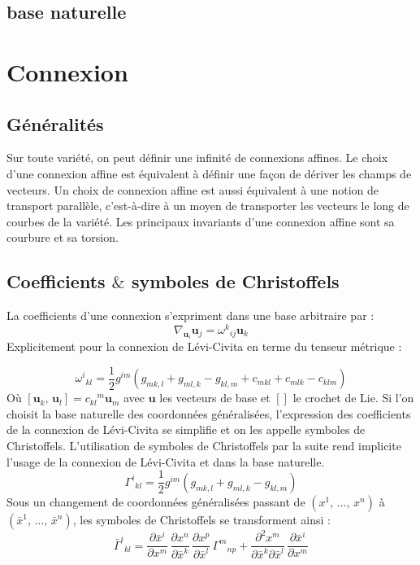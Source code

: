 \documentclass[10pt, a4paper]{report}
\numberwithin{equation}{subsection}
\begin{document}
\subsection{base naturelle}


\section{Connexion}
\subsection{Généralités}
Sur toute variété, on peut définir une infinité de connexions affines. Le choix d'une connexion affine est équivalent à définir une façon de dériver les champs de vecteurs. Un choix de connexion affine est aussi équivalent à une notion de transport parallèle, c'est-à-dire à un moyen de transporter les vecteurs le long de courbes de la variété. Les principaux invariants d'une connexion affine sont sa courbure et sa torsion.


\subsection{Coefficients $\&$ symboles de Christoffels}
La coefficients d'une connexion s'expriment dans une base arbitraire par :
\begin{equation}
\boxed{\nabla_{\mathbf{u}_i}\mathbf{u}_j = {\omega^k}_{ij}\mathbf{u}_k}
\end{equation}
Explicitement pour la connexion de Lévi-Civita en terme du tenseur métrique :

\begin{equation}
\boxed{{\omega^i}_{kl} = \frac{1}{2} g^{im} \left( g_{mk,l} + g_{ml,k} - g_{kl,m} + c_{mkl} + c_{ml k} - c_{kl m} \right)}
\end{equation}
Où $[\mathbf{u}_k,\, \mathbf{u}_l] = {c_{kl}}^m \mathbf{u}_m$ avec $\mathbf{u}$ les vecteurs de base et $[]$ le crochet de Lie.
Si l'on choisit la base naturelle des coordonnées généralisées, l'expression des coefficients de la connexion de Lévi-Civita se simplifie et on les appelle symboles de Christoffels. L'utilisation de symboles de Christoffels par la suite rend implicite l'usage de la connexion de Lévi-Civita et dans la base naturelle.
\begin{equation}
\boxed{{\Gamma^i}_{kl} = \frac{1}{2} g^{im} \left(g_{mk,l} + g_{ml,k} - g_{kl,m}\right)}
\end{equation}
 Sous un changement de coordonnées généralisées passant de $\left(x^1,\, \ldots,\, x^n\right)$ à $\left(\bar{x}^1,\, \ldots,\, \bar{x}^n\right)$, les symboles de Christoffels se transforment ainsi :
\begin{equation}
\boxed{{\bar{\Gamma}^i}_{kl} =
  \frac{\partial \bar{x}^i}{\partial x^m}\,
  \frac{\partial x^n}{\partial \bar{x}^k}\,
  \frac{\partial x^p}{\partial \bar{x}^l}\,
  {\Gamma^m}_{np}
  + 
  \frac{\partial^2  x^m}{\partial \bar{x}^k \partial \bar{x}^l}\,
  \frac{\partial \bar{x}^i}{\partial x^m}}
\end{equation}
\end{document}
